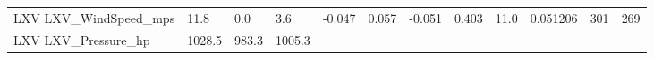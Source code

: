 \documentclass[11pt]{article}
\begin{document}
\begin{longtable}[]{@{}llllllllllll@{}}
\begin{minipage}[t]{0.18\columnwidth}
LXV LXV\_WindSpeed\_mps\strut
\end{minipage} & \begin{minipage}[t]{0.04\columnwidth}\raggedright\strut
11.8\strut
\end{minipage} & \begin{minipage}[t]{0.04\columnwidth}\raggedright\strut
0.0\strut
\end{minipage} & \begin{minipage}[t]{0.04\columnwidth}\raggedright\strut
3.6\strut
\end{minipage} & \begin{minipage}[t]{0.04\columnwidth}\raggedright\strut
-0.047\strut
\end{minipage} & \begin{minipage}[t]{0.05\columnwidth}\raggedright\strut
0.057\strut
\end{minipage} & \begin{minipage}[t]{0.04\columnwidth}\raggedright\strut
-0.051\strut
\end{minipage} & \begin{minipage}[t]{0.04\columnwidth}\raggedright\strut
0.403\strut
\end{minipage} & \begin{minipage}[t]{0.05\columnwidth}\raggedright\strut
11.0\strut
\end{minipage} & \begin{minipage}[t]{0.05\columnwidth}\raggedright\strut
0.051206\strut
\end{minipage} & \begin{minipage}[t]{0.05\columnwidth}\raggedright\strut
301\strut
\end{minipage} & \begin{minipage}[t]{0.07\columnwidth}\raggedright\strut
269\strut
\end{minipage}\tabularnewline
\begin{minipage}[t]{0.18\columnwidth}\raggedright\strut
LXV LXV\_Pressure\_hp\strut
\end{minipage} & \begin{minipage}[t]{0.04\columnwidth}\raggedright\strut
1028.5\strut
\end{minipage} & \begin{minipage}[t]{0.04\columnwidth}\raggedright\strut
983.3\strut
\end{minipage} & \begin{minipage}[t]{0.04\columnwidth}\raggedright\strut
1005.3\strut
\end{minipage} & \begin{minipage}[t]{0.04\columnwidth}\raggedright\strut

\end{minipage}
\end{longtable}
\end{document}
